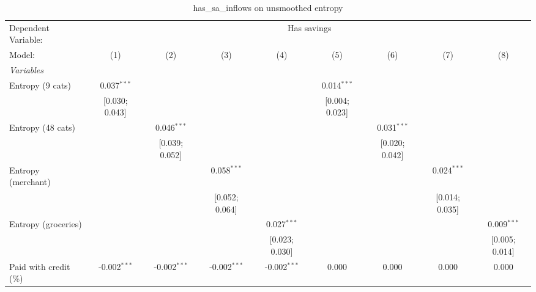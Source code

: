 
\begin{table}[htbp]
   \centering
   \tiny
   \begin{threeparttable}[b]
      \caption{\label{tab:reg_has_sa_inflows} has\_sa\_inflows on unsmoothed entropy}
      \begin{tabular}{lcccccccc}
         \tabularnewline \midrule \midrule
         Dependent Variable: & \multicolumn{8}{c}{Has savings}\\
         Model:                 & (1)              & (2)              & (3)              & (4)              & (5)             & (6)             & (7)             & (8)\\  
         \midrule
         \emph{Variables}\\
         Entropy (9 cats)       & 0.037$^{***}$    &                  &                  &                  & 0.014$^{***}$   &                 &                 &   \\   
                                & [0.030; 0.043]   &                  &                  &                  & [0.004; 0.023]  &                 &                 &   \\   
         Entropy (48 cats)      &                  & 0.046$^{***}$    &                  &                  &                 & 0.031$^{***}$   &                 &   \\   
                                &                  & [0.039; 0.052]   &                  &                  &                 & [0.020; 0.042]  &                 &   \\   
         Entropy (merchant)     &                  &                  & 0.058$^{***}$    &                  &                 &                 & 0.024$^{***}$   &   \\   
                                &                  &                  & [0.052; 0.064]   &                  &                 &                 & [0.014; 0.035]  &   \\   
         Entropy (groceries)    &                  &                  &                  & 0.027$^{***}$    &                 &                 &                 & 0.009$^{***}$\\   
                                &                  &                  &                  & [0.023; 0.030]   &                 &                 &                 & [0.005; 0.014]\\   
         Paid with credit (\%)  & -0.002$^{***}$   & -0.002$^{***}$   & -0.002$^{***}$   & -0.002$^{***}$   & 0.000           & 0.000           & 0.000           & 0.000\\   

\end{tabular}
\end{threeparttable}
\end{table}
